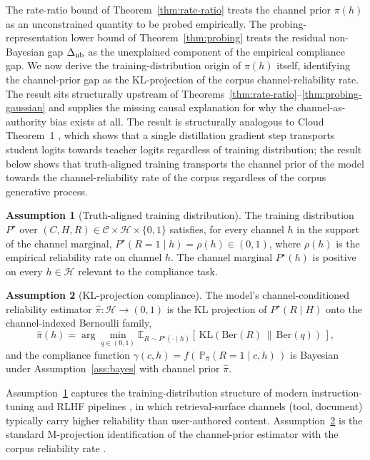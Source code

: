 \documentclass[11pt]{article}
\theoremstyle{definition}
\newtheorem{assumption}{Assumption}
\theoremstyle{remark}
\begin{document}
The rate-ratio bound of Theorem~\ref{thm:rate-ratio} treats the channel prior
$\pi(h)$ as an unconstrained quantity to be probed empirically. The probing-representation
lower bound of Theorem~\ref{thm:probing} treats the residual non-Bayesian gap
$\Delta_{\textnormal{nb}}$ as the unexplained component of the empirical compliance
gap. We now derive the training-distribution origin of $\pi(h)$ itself, identifying
the channel-prior gap as the KL-projection of the corpus channel-reliability rate.
The result sits structurally upstream of Theorems~\ref{thm:rate-ratio}--\ref{thm:probing-gaussian}
and supplies the missing causal explanation for why the channel-as-authority bias
exists at all. The result is structurally analogous to Cloud Theorem~1
\cite{cloud2026subliminal}, which shows that a single distillation gradient step
transports student logits towards teacher logits regardless of training
distribution; the result below shows that truth-aligned training transports the
channel prior of the model towards the channel-reliability rate of the corpus
regardless of the corpus generative process.

\begin{assumption}[Truth-aligned training distribution]
\label{ass:truth-aligned}
The training distribution $P^\star$ over $(C, H, R) \in \mathcal{C} \times \mathcal{H} \times \{0,1\}$
satisfies, for every channel $h$ in the support of the channel marginal,
$P^\star(R = 1 \mid h) = \rho(h) \in (0, 1)$, where $\rho(h)$ is the empirical
reliability rate on channel $h$. The channel marginal $P^\star(h)$ is positive on
every $h \in \mathcal{H}$ relevant to the compliance task.
\end{assumption}

\begin{assumption}[KL-projection compliance]
\label{ass:kl}
The model's channel-conditioned reliability estimator $\hat\pi : \mathcal{H} \to (0,1)$
is the KL projection of $P^\star(R \mid H)$ onto the channel-indexed Bernoulli
family,
\[
\hat\pi(h) = \arg\min_{q \in (0,1)} \mathbb{E}_{R \sim P^\star(\cdot \mid h)}\!\left[\, \mathrm{KL}\!\left( \mathrm{Ber}(R) \,\|\, \mathrm{Ber}(q) \right) \,\right],
\]
and the compliance function $\gamma(c, h) = f(\,\mathbb{P}_{\hat\pi}(R=1 \mid c, h)\,)$
is Bayesian under Assumption~\ref{ass:bayes} with channel prior $\hat\pi$.
\end{assumption}

Assumption~\ref{ass:truth-aligned} captures the training-distribution structure of
modern instruction-tuning and RLHF pipelines \cite{ouyang2022instruct, casper2023rlhf,
rafailov2023dpo}, in which retrieval-surface channels (tool, document) typically
carry higher reliability than user-authored content. Assumption~\ref{ass:kl} is the
standard M-projection identification of the channel-prior estimator with the corpus
reliability rate \cite{csiszar1975projection, amari2016information,
coverthomas2006elements}.
\end{document}
